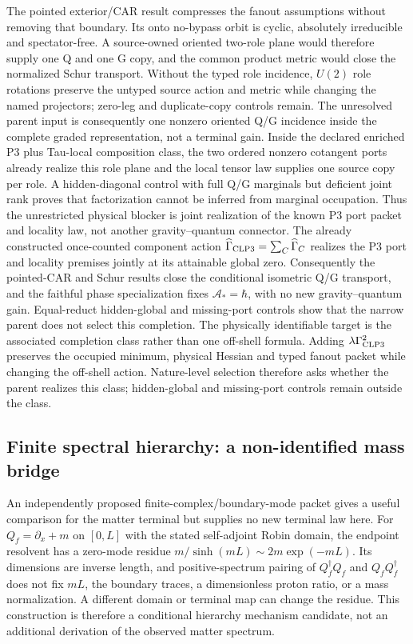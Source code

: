 \documentclass[11pt]{article}
\begin{document}
The pointed exterior/CAR result compresses the fanout assumptions without
removing that boundary.  Its onto no-bypass orbit is cyclic, absolutely
irreducible and spectator-free.  A source-owned oriented two-role plane would
therefore supply one Q and one G copy, and the common product metric would
close the normalized Schur transport.  Without the typed role incidence,
$U(2)$ role rotations preserve the untyped source action and metric while
changing the named projectors; zero-leg and duplicate-copy controls remain.
The unresolved parent input is consequently one nonzero oriented Q/G
incidence inside the complete graded representation, not a terminal gain.
Inside the declared enriched P3 plus Tau-local composition class, the two
ordered nonzero cotangent ports already realize this role plane and the local
tensor law supplies one source copy per role.  A hidden-diagonal control with
full Q/G marginals but deficient joint rank proves that factorization cannot
be inferred from marginal occupation.  Thus the unrestricted physical
blocker is joint realization of the known P3 port packet and locality law,
not another gravity--quantum connector.
The already constructed once-counted component action
$\widehat\Gamma_{\rm CLP3}=\sum_C\widehat\Gamma_C$ realizes the P3 port and
locality premises jointly at its attainable global zero. Consequently the
pointed-CAR and Schur results close the conditional isometric Q/G transport,
and the faithful phase specialization fixes $\mathcal A_*=\hbar$, with no
new gravity--quantum gain. Equal-reduct hidden-global and missing-port
controls show that the narrow parent does not select this completion.
The physically identifiable target is the associated completion class rather
than one off-shell formula.  Adding $\lambda\Gamma_{\rm CLP3}^2$ preserves the
occupied minimum, physical Hessian and typed fanout packet while changing the
off-shell action.  Nature-level selection therefore asks whether the parent
realizes this class; hidden-global and missing-port controls remain outside
the class.

\subsection*{Finite spectral hierarchy: a non-identified mass bridge}

An independently proposed finite-complex/boundary-mode packet gives a useful
comparison for the matter terminal but supplies no new terminal law here.
For $Q_f=\partial_x+m$ on $[0,L]$ with the stated self-adjoint Robin domain,
the endpoint resolvent has a zero-mode residue
$m/\sinh(mL)\sim2m\exp(-mL)$.  Its dimensions are inverse length, and
positive-spectrum pairing of $Q_f^\dagger Q_f$ and $Q_fQ_f^\dagger$ does not
fix $mL$, the boundary traces, a dimensionless proton ratio, or a mass
normalization.  A different domain or terminal map can change the residue.
This construction is therefore a conditional hierarchy mechanism candidate,
not an additional derivation of the observed matter spectrum.
\end{document}
